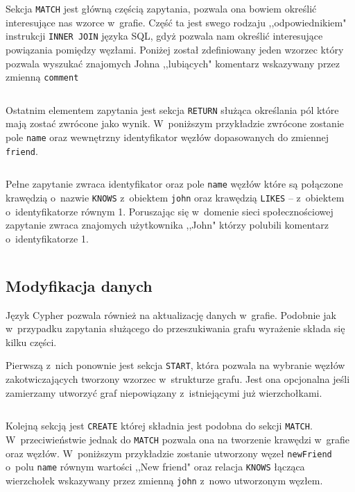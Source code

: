 \documentclass[brudnopis]{xmgr}
\begin{document}
\inputminted{cypher}{listings/cypher/start-section.cypher}

Sekcja \texttt{MATCH} jest główną częścią zapytania, pozwala ona bowiem określić interesujące nas wzorce w~grafie. Część ta jest swego rodzaju ,,odpowiednikiem" instrukcji \texttt{INNER JOIN} języka SQL, gdyż pozwala nam określić interesujące powiązania pomiędzy węzłami. Poniżej został zdefiniowany jeden wzorzec który pozwala wyszukać znajomych Johna ,,lubiących" komentarz wskazywany przez zmienną \texttt{comment}

\inputminted{cypher}{listings/cypher/match-section.cypher}

Ostatnim elementem zapytania jest sekcja \texttt{RETURN} służąca określania pól które mają zostać zwrócone jako wynik. W~poniższym przykładzie zwrócone zostanie pole \texttt{name} oraz wewnętrzny identyfikator węzłów dopasowanych do zmiennej \texttt{friend}.

\inputminted{cypher}{listings/cypher/return-section.cypher}

Pełne zapytanie zwraca identyfikator oraz pole \texttt{name} węzłów które są połączone krawędzią o~nazwie \texttt{KNOWS} z~obiektem \texttt{john} oraz krawędzią \texttt{LIKES} -- z~obiektem o~identyfikatorze równym {1}. Poruszając się w~domenie sieci społecznościowej zapytanie zwraca znajomych użytkownika ,,John" którzy polubili komentarz o~identyfikatorze {1}.

\inputminted{cypher}{listings/cypher/sample-query.cypher}

\subsection{Modyfikacja danych}

Język Cypher pozwala również na aktualizację danych w~grafie. Podobnie jak w~przypadku zapytania służącego do przeszukiwania grafu wyrażenie składa się kilku części.

Pierwszą z~nich ponownie jest sekcja \texttt{START}, która pozwala na wybranie węzłów zakotwiczających tworzony wzorzec w~strukturze grafu. Jest ona opcjonalna jeśli zamierzamy utworzyć graf niepowiązany z~istniejącymi już wierzchołkami.

\inputminted{cypher}{listings/cypher/start-section.cypher}

Kolejną sekcją jest \texttt{CREATE} której składnia jest podobna do sekcji \texttt{MATCH}. W~przeciwieństwie jednak do \texttt{MATCH} pozwala ona na tworzenie krawędzi w~grafie oraz węzłów. W~poniższym przykładzie zostanie utworzony węzeł \texttt{newFriend} o~polu \texttt{name} równym wartości ,,New friend" oraz relacja \texttt{KNOWS} łącząca wierzchołek wskazywany przez zmienną \texttt{john} z~nowo utworzonym węzłem.
\end{document}
